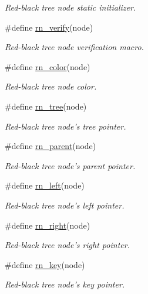 \begin{CompactItemize}
\begin{CompactList}\small\item\em Red-black tree node static initializer. \item\end{CompactList}\item 
\#define \hyperlink{group__dbprim__rbtree_ga32}{rn\_\-verify}(node)
\begin{CompactList}\small\item\em Red-black tree node verification macro. \item\end{CompactList}\item 
\#define \hyperlink{group__dbprim__rbtree_ga33}{rn\_\-color}(node)
\begin{CompactList}\small\item\em Red-black tree node color. \item\end{CompactList}\item 
\#define \hyperlink{group__dbprim__rbtree_ga34}{rn\_\-tree}(node)
\begin{CompactList}\small\item\em Red-black tree node's tree pointer. \item\end{CompactList}\item 
\#define \hyperlink{group__dbprim__rbtree_ga35}{rn\_\-parent}(node)
\begin{CompactList}\small\item\em Red-black tree node's parent pointer. \item\end{CompactList}\item 
\#define \hyperlink{group__dbprim__rbtree_ga36}{rn\_\-left}(node)
\begin{CompactList}\small\item\em Red-black tree node's left pointer. \item\end{CompactList}\item 
\#define \hyperlink{group__dbprim__rbtree_ga37}{rn\_\-right}(node)
\begin{CompactList}\small\item\em Red-black tree node's right pointer. \item\end{CompactList}\item 
\#define \hyperlink{group__dbprim__rbtree_ga38}{rn\_\-key}(node)
\begin{CompactList}\small\item\em Red-black tree node's key pointer. \item\end{CompactList}\item 

\end{CompactItemize}
